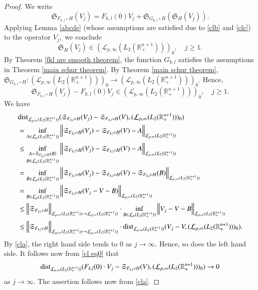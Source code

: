 \documentclass{amsart}
\begin{document}
\begin{proof} We write
$$\mathfrak{S}_{F_{k,l}\circ H}(V_j)=F_{k,l}(0)V_j+\mathfrak{S}_{G_{k,l}\circ H}(\mathfrak{S}_H(V_j)).$$
Applying Lemma \ref{abcde} (whose assumptions are satisfied due to \eqref{clb} and \eqref{clc}) to the operator $V_j,$ we conclude
$$\mathfrak{S}_H(V_j)\in (\mathcal{L}_{p,\infty}(L_2(\mathbb{R}^{n+1}_+)))_0,\quad j\geq 1.$$
By Theorem \ref{fkl are smooth theorem}, the function $G_{k,l}$ satisfies the assumptions in Theorem \ref{main schur theorem}. By Theorem \ref{main schur theorem},  $\mathfrak{S}_{G_{k,l}\circ H}:(\mathcal{L}_{p,\infty}(L_2(\mathbb{R}^{n+1}_+)))_0\to (\mathcal{L}_{p,\infty}(L_2(\mathbb{R}^{n+1}_+)))_0.$  Hence,
\begin{equation}\label{cl eq0}
\mathfrak{S}_{F_{k,l}\circ H}(V_j)-F_{k,l}(0)V_j\in (\mathcal{L}_{p,\infty}(L_2(\mathbb{R}^{n+1}_+)))_0,\quad j\geq 1.
\end{equation}
We have
\begin{align*}
&{\rm dist}_{\mathcal{L}_{p,\infty}(L_2(\mathbb{R}^{n+1}_+))}(\mathfrak{S}_{F_{k,l}\circ H}(V_j)-\mathfrak{S}_{F_{k,l}\circ H}(V),(\mathcal{L}_{p,\infty}(L_2(\mathbb{R}^{n+1}_+)))_0)\\
&=\inf_{A\in \mathcal{L}_p(L_2(\mathbb{R}^{n+1}_+))}\Big\|\mathfrak{S}_{F_{k,l}\circ H}(V_j)-\mathfrak{S}_{F_{k,l}\circ H}(V)-A\Big\|_{\mathcal{L}_{p,\infty}(L_2(\mathbb{R}^{n+1}_+))}\\
&\leq\inf_{\substack{A=\mathfrak{S}_{F_{k,l}\circ H}(B)\\ B\in \mathcal{L}_p(L_2(\mathbb{R}^{n+1}_+))}}\Big\|\mathfrak{S}_{F_{k,l}\circ H}(V_j)-\mathfrak{S}_{F_{k,l}\circ H}(V)-A\Big\|_{\mathcal{L}_{p,\infty}(L_2(\mathbb{R}^{n+1}_+))}\\
&=\inf_{B\in \mathcal{L}_p(L_2(\mathbb{R}^{n+1}_+))}\Big\|\mathfrak{S}_{F_{k,l}\circ H}(V_j)-\mathfrak{S}_{F_{k,l}\circ H}(V)-\mathfrak{S}_{F_{k,l}\circ H}(B)\Big\|_{\mathcal{L}_{p,\infty}(L_2(\mathbb{R}^{n+1}_+))}\\
&=\inf_{B\in \mathcal{L}_p(L_2(\mathbb{R}^{n+1}_+))}\Big\|\mathfrak{S}_{F_{k,l}\circ H}(V_j-V-B)\Big\|_{\mathcal{L}_{p,\infty}(L_2(\mathbb{R}^{n+1}_+))}\\
&\leq\Big\|\mathfrak{S}_{F_{k,l}\circ H}\Big\|_{\mathcal{L}_{p,\infty}(L_2(\mathbb{R}^{n+1}_+))\to\mathcal{L}_{p,\infty}(L_2(\mathbb{R}^{n+1}_+))}\cdot\inf_{B\in \mathcal{L}_p(L_2(\mathbb{R}^{n+1}_+))}\Big\|V_j-V-B\Big\|_{\mathcal{L}_{p,\infty}(L_2(\mathbb{R}^{n+1}_+))}\\
&\leq\Big\|\mathfrak{S}_{F_{k,l}\circ H}\Big\|_{\mathcal{L}_{p,\infty}(L_2(\mathbb{R}^{n+1}_+))\to\mathcal{L}_{p,\infty}(L_2(\mathbb{R}^{n+1}_+))}\cdot{\rm dist}_{\mathcal{L}_{p,\infty}(L_2(\mathbb{R}^{n+1}_+))}(V_j-V,(\mathcal{L}_{p,\infty}(L_2(\mathbb{R}^{n+1}_+)))_0).
\end{align*}
By \eqref{cla}, the right hand side tends to $0$ as $j\to\infty.$ Hence, so does the left hand side. It follows now from \eqref{cl eq0} that
$${\rm dist}_{\mathcal{L}_{p,\infty}(L_2(\mathbb{R}^{n+1}_+))}(F_{k,l}(0)\cdot V_j-\mathfrak{S}_{F_{k,l}\circ H}(V),(\mathcal{L}_{p,\infty}(L_2(\mathbb{R}^{n+1}_+)))_0)\to0$$
as $j\to\infty.$ The assertion follows now from \eqref{cla}.
\end{proof}
\end{document}
